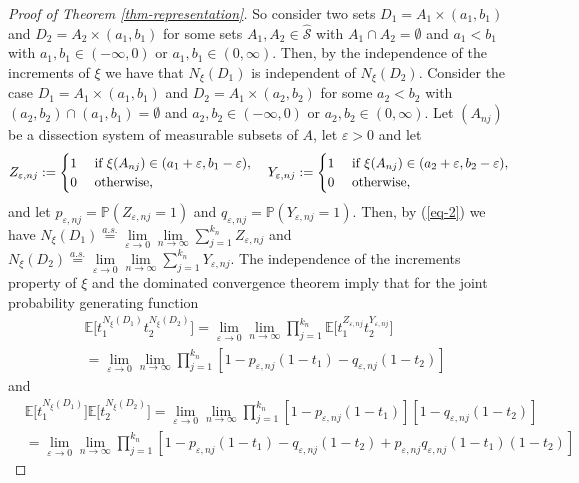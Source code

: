 \documentclass{article}
\theoremstyle{plain}
\theoremstyle{remark}
\begin{document}
\begin{proof}[Proof of Theorem \ref{thm-representation}]
	So consider two sets $D_1=A_1\times (a_1,b_1)$ and $D_2=A_2\times (a_1,b_1)$ for some sets $A_1,A_2\in\hat{\mathcal{S}}$ with $A_1\cap A_2=\emptyset$ and $a_1<b_1$ with $a_1,b_1\in (-\infty,0)$ or $a_1,b_1\in (0,\infty)$. Then, by the independence of the increments of $\xi$ we have that $N_\xi(D_1)$ is independent of $N_\xi(D_2)$. Consider the case $D_1=A_1\times (a_1,b_1)$ and $D_2=A_1\times (a_2,b_2)$ for some $a_2<b_2$ with $(a_2,b_2)\cap (a_1,b_1)=\emptyset$ and $a_2,b_2\in (-\infty,0)$ or $a_2,b_2\in (0,\infty)$. Let $(A_{nj})$ be a dissection system of measurable subsets of $A$, let $\varepsilon>0$ and let 
	\begin{equation*}
		Z_{\varepsilon, nj}:=\begin{cases}
			1\,&\textnormal{if $\xi(A_{nj})\in(a_1+\varepsilon,b_1-\varepsilon)$},\\0 \,\,&\textnormal{otherwise,}
		\end{cases}
		\quad
		Y_{\varepsilon, nj}:=\begin{cases}
			1\,&\textnormal{if $\xi(A_{nj})\in(a_2+\varepsilon,b_2-\varepsilon)$},\\0 \,\,&\textnormal{otherwise,}
		\end{cases}
	\end{equation*}
	and let $p_{\varepsilon, nj}=\mathbb{P}(Z_{\varepsilon,nj}=1)$ and $q_{\varepsilon, nj}=\mathbb{P}(Y_{\varepsilon,nj}=1)$. Then, by (\ref{eq-2}) we have $N_\xi(D_1)\stackrel{a.s.}{=}\lim\limits_{\varepsilon\to 0}\lim\limits_{n\to\infty}\sum_{j=1}^{k_n}Z_{\varepsilon,nj}$ and $N_\xi(D_2)\stackrel{a.s.}{=}\lim\limits_{\varepsilon\to 0}\lim\limits_{n\to\infty}\sum_{j=1}^{k_n}Y_{\varepsilon,nj}$. The independence of the increments property of $\xi$ and the dominated convergence theorem imply that for the joint probability generating function
	\begin{align}
		&\mathbb{E}\big[t_1^{N_\xi(D_1)}t_2^{N_\xi(D_2)}\big]=\lim\limits_{\varepsilon\to 0}\lim\limits_{n\to\infty}\prod_{j=1}^{k_n}\mathbb{E}\big[t_1^{Z_{\varepsilon,nj}}t_2^{Y_{\varepsilon,nj}}\big]\nonumber\\&	=\lim\limits_{\varepsilon\to 0}\lim\limits_{n\to\infty}\prod_{j=1}^{k_n}[1-p_{\varepsilon,nj}(1-t_1)-q_{\varepsilon,nj}(1-t_2)]\label{eq-t_1}
	\end{align}
	and
	\begin{align}
		&\mathbb{E}\big[t_1^{N_\xi(D_1)}\big]\mathbb{E}\big[t_2^{N_\xi(D_2)}\big]=\lim\limits_{\varepsilon\to 0}\lim\limits_{n\to\infty}\prod_{j=1}^{k_n}[1-p_{\varepsilon,nj}(1-t_1)][1-q_{\varepsilon,nj}(1-t_2)]\nonumber\\&	=\lim\limits_{\varepsilon\to 0}\lim\limits_{n\to\infty}\prod_{j=1}^{k_n}[1-p_{\varepsilon,nj}(1-t_1)-q_{\varepsilon,nj}(1-t_2)+p_{\varepsilon,nj}q_{\varepsilon,nj}(1-t_1)(1-t_2)]\label{eq-t_2}

\end{align}
\end{proof}
\end{document}
